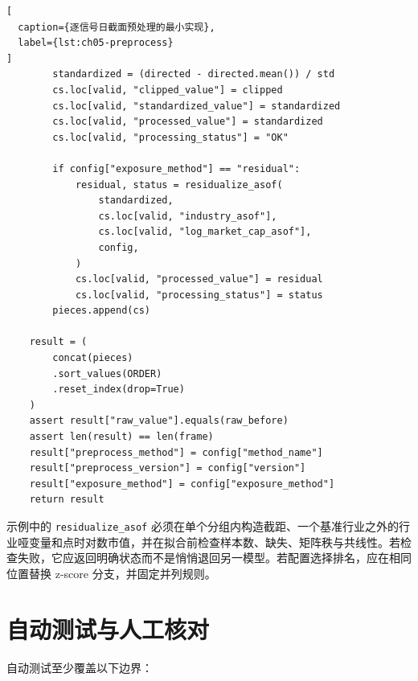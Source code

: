\begin{lstlisting}[
  caption={逐信号日截面预处理的最小实现},
  label={lst:ch05-preprocess}
]
        standardized = (directed - directed.mean()) / std
        cs.loc[valid, "clipped_value"] = clipped
        cs.loc[valid, "standardized_value"] = standardized
        cs.loc[valid, "processed_value"] = standardized
        cs.loc[valid, "processing_status"] = "OK"

        if config["exposure_method"] == "residual":
            residual, status = residualize_asof(
                standardized,
                cs.loc[valid, "industry_asof"],
                cs.loc[valid, "log_market_cap_asof"],
                config,
            )
            cs.loc[valid, "processed_value"] = residual
            cs.loc[valid, "processing_status"] = status
        pieces.append(cs)

    result = (
        concat(pieces)
        .sort_values(ORDER)
        .reset_index(drop=True)
    )
    assert result["raw_value"].equals(raw_before)
    assert len(result) == len(frame)
    result["preprocess_method"] = config["method_name"]
    result["preprocess_version"] = config["version"]
    result["exposure_method"] = config["exposure_method"]
    return result
\end{lstlisting}

示例中的 \texttt{residualize\_asof} 必须在单个分组内构造截距、一个基准行业之外的行业哑变量和点时对数市值，并在拟合前检查样本数、缺失、矩阵秩与共线性。若检查失败，它应返回明确状态而不是悄悄退回另一模型。若配置选择排名，应在相同位置替换 z-score 分支，并固定并列规则。

\section{自动测试与人工核对}

自动测试至少覆盖以下边界：

